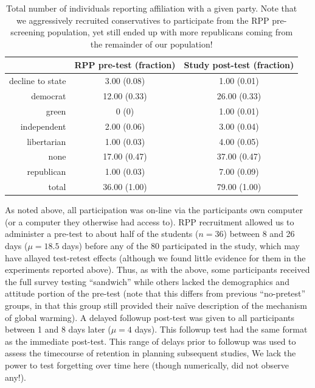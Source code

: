 \begin{table}[ht]
    \caption{Total number of individuals reporting affiliation with a given
        party. Note that we aggressively recruited conservatives to participate
        from the RPP pre-screening population, yet still ended up with more
        republicans coming from the remainder of our population!}
    \label{table:mech-rpp-party-affiliations}
\centering
\begin{tabular}{rcc}
  \toprule
 & RPP pre-test (fraction) & Study post-test (fraction) \\ 
  \midrule
  decline to state & 3.00 (0.08) & 1.00 (0.01) \\ 
  democrat & 12.00 (0.33) & 26.00 (0.33) \\ 
  green & 0 (0) & 1.00 (0.01) \\ 
  independent & 2.00 (0.06) & 3.00 (0.04) \\ 
  libertarian & 1.00 (0.03) & 4.00 (0.05) \\ 
  none & 17.00 (0.47) & 37.00 (0.47) \\ 
  republican & 1.00 (0.03) & 7.00 (0.09) \\ 
  \midrule
  total & 36.00 (1.00) & 79.00 (1.00) \\ 
   \bottomrule
\end{tabular}
\end{table}
As noted above, all participation was on-line via the participants own computer
(or a computer they otherwise had access to). RPP recruitment allowed us to
administer a pre-test to about half of the students ($n=36$) between 8 and 26
days ($\mu=18.5$ days) before any of the 80 participated in the study, which may
have allayed test-retest effects (although we found little evidence for them in
the experiments reported above).  Thus, as with the above, some participants
received the full survey testing ``sandwich'' while others lacked the
demographics and attitude portion of the pre-test (note that this differs from
previous “no-pretest” groups, in that this group still provided their na\"ive
description of the mechanism of global warming).
A delayed followup post-test was given to all participants between 1 and 8 days
later ($\mu=4$ days). This followup test had the same format as the immediate
post-test. This range of delays prior to followup was used to assess the
timecourse of retention in planning subsequent studies, We lack the power to
test forgetting over time here (though numerically, did not observe any!).

